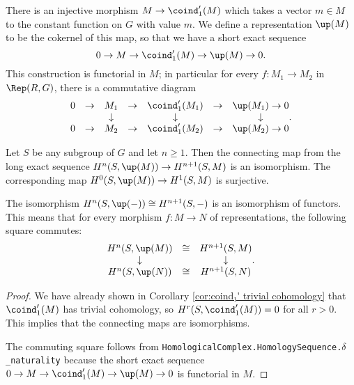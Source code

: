 \begin{definition} \label{def:up}
	There is an injective morphism $M \to \coind_1'(M)$ which takes a vector $m \in M$
	to the constant function on $G$ with value $m$.
	We define a representation $\up(M)$ to be the cokernel of this map, so that we have a short exact
	sequence
	\[
		0 \to M \to \coind_1'(M) \to \up(M) \to 0.
	\]
	This construction is functorial in $M$;
	in particular for every $f : M_1 \to M_2$ in $\Rep(R,G)$,
	there is a commutative diagram
	\[
		\begin{matrix}
			0 & \to & M_1 & \to & \coind_1'(M_1) & \to& \up(M_1) \to 0 \\
			&&\downarrow &&\downarrow&&\downarrow \\
			0 & \to & M_2 & \to & \coind_1'(M_2) & \to& \up(M_2) \to 0 \\
		\end{matrix}.
	\]
\end{definition}

\begin{corollary}	\label{cor:up iso}
	\leanok
	Let $S$ be any subgroup of $G$ and let $n \ge 1$.
	Then the connecting map from the long exact sequence $H^{n}(S,\up(M)) \to H^{n+1}(S,M)$ is an
	isomorphism.
	The corresponding map $H^{0}(S,\up(M)) \to H^{1}(S,M)$ is	surjective.

	The isomorphism $H^{n}(S,\up(-)) \cong H^{n+1}(S,-)$ is an isomorphism of functors.
	This means that for every morphism $f : M \to N$ of representations,
	the following square commutes:
	\[
		\begin{matrix}
			H^{n}(S,\up(M)) & \cong & H^{n+1}(S,M) \\
			\downarrow && \downarrow \\
			H^{n}(S,\up(N)) & \cong & H^{n+1}(S,N)
		\end{matrix}.
	\]
\end{corollary}

\begin{proof}
	We have already shown in Corollary \ref{cor:coind₁' trivial cohomology}
	that $\coind_1'(M)$ has trivial cohomology, so $H^{r}(S,\coind_1'(M))=0$
	for all $r>0$. This implies that the connecting maps are isomorphisms.

	The commuting square follows from
	\texttt{HomologicalComplex.HomologySequence.$\delta$\_naturality}
	because the short exact sequence $0 \to M \to \coind_1'(M) \to \up(M) \to 0$
	is functorial in $M$.
\end{proof}


